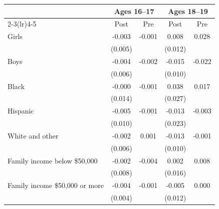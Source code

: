 \begin{tabular}{lcccc}
\toprule
 & \multicolumn{2}{c}{Ages 16--17} & \multicolumn{2}{c}{Ages 18--19} \\
\cmidrule(lr){2-3}\cmidrule(lr){4-5}
 & Post & Pre & Post & Pre \\
\midrule
Girls & -0.003 & -0.001 & 0.008 & 0.028 \\
 & (0.005) &  & (0.012) &  \\
Boys & -0.004 & -0.002 & -0.015 & -0.022 \\
 & (0.006) &  & (0.010) &  \\
Black & -0.000 & -0.001 & 0.038 & 0.017 \\
 & (0.014) &  & (0.027) &  \\
Hispanic & -0.005 & -0.001 & -0.013 & -0.003 \\
 & (0.010) &  & (0.023) &  \\
White and other & -0.002 & 0.001 & -0.013 & -0.001 \\
 & (0.006) &  & (0.010) &  \\
Family income below \$50,000 & -0.002 & -0.004 & 0.002 & 0.008 \\
 & (0.008) &  & (0.016) &  \\
Family income \$50,000 or more & -0.004 & -0.001 & -0.005 & 0.000 \\
 & (0.004) &  & (0.012) &  \\
\bottomrule
\end{tabular}
